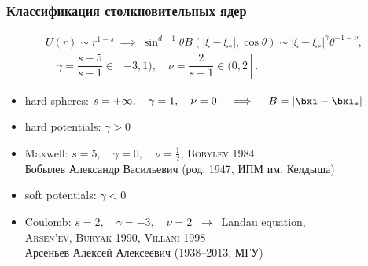 \documentclass[mathserif]{beamer} %
\newcommand{\Cite}[2][]{\alert{\textsc{#2 #1}}}
\begin{document}
\begin{frame}
    \frametitle{Классификация столкновительных ядер}
    \begin{gather*}
        U(r)\sim r^{1-s} \:\implies\: \sin^{d-1}\theta B(|\xi-\xi_*|,\cos\theta) \sim |\xi-\xi_*|^\gamma \theta^{-1-\nu}, \\
        \quad \gamma = \dfrac{s-5}{s-1}\in[-3,1), \quad \nu = \dfrac2{s-1}\in(0,2].
    \end{gather*}
    \begin{itemize}
        \item hard spheres: \(s=+\infty,\quad\gamma=1,\quad\nu=0 \quad\implies\quad B=|\bxi-\bxi_*|\)
        \item hard potentials: \(\gamma>0\)
        \item Maxwell: \(s=5,\quad\gamma=0,\quad\nu=\frac12\), \quad \Cite[1984]{Bobylev}\\
            {\footnotesize Бобылев Александр Васильевич (род. 1947, ИПМ им. Келдыша)}
        \item soft potentials: \(\gamma<0\)
        \item Coulomb: \(s=2,\quad\gamma=-3,\quad\nu=2\) \(\:\longrightarrow\:\) Landau equation,\\
            \Cite[1990]{Arsen'ev, Buryak}, \Cite[1998]{Villani} \\
            {\footnotesize Арсеньев Алексей Алексеевич (1938--2013, МГУ)}
    \end{itemize}
\end{frame}
\end{document}
